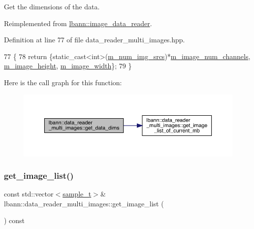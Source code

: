 Get the dimensions of the data. 



Reimplemented from \hyperlink{classlbann_1_1image__data__reader_a1bb05018e059afae76d46a2a908dd75c}{lbann\+::image\+\_\+data\+\_\+reader}.



Definition at line 77 of file data\+\_\+reader\+\_\+multi\+\_\+images.\+hpp.


\begin{DoxyCode}
77                                                       \{
78     \textcolor{keywordflow}{return} \{\textcolor{keyword}{static\_cast<}\textcolor{keywordtype}{int}\textcolor{keyword}{>}(\hyperlink{classlbann_1_1data__reader__multi__images_a70752a5442e99333fec52def9eadc58f}{m\_num\_img\_srcs})*\hyperlink{classlbann_1_1image__data__reader_aab1a440f361521dc7bd583cefe1061f8}{m\_image\_num\_channels}, 
      \hyperlink{classlbann_1_1image__data__reader_a0632efa3deaa9d61e671f741909eb3fe}{m\_image\_height}, \hyperlink{classlbann_1_1image__data__reader_af001f3d1c0f1c580b66988233b3a64f0}{m\_image\_width}\};
79   \}
\end{DoxyCode}
Here is the call graph for this function\+:\nopagebreak
\begin{figure}[H]
\begin{center}
\leavevmode
\includegraphics[width=350pt]{classlbann_1_1data__reader__multi__images_aca93e0ab0edf13397de414d41aff1cd1_cgraph}
\end{center}
\end{figure}
\mbox{\label{classlbann_1_1data__reader__multi__images_a55dff5f22fcf4f26c7d561998c0481d4}} 
\subsubsection{\texorpdfstring{get\+\_\+image\+\_\+list()}{get\_image\_list()}}
{\footnotesize\ttfamily const std\+::vector$<$\hyperlink{classlbann_1_1data__reader__multi__images_a6cbb30001dd633b0d810c417cbbf441e}{sample\+\_\+t}$>$\& lbann\+::data\+\_\+reader\+\_\+multi\+\_\+images\+::get\+\_\+image\+\_\+list (\begin{DoxyParamCaption}{ }\end{DoxyParamCaption}) const\hspace{0.3cm}{\ttfamily [inline]}}



